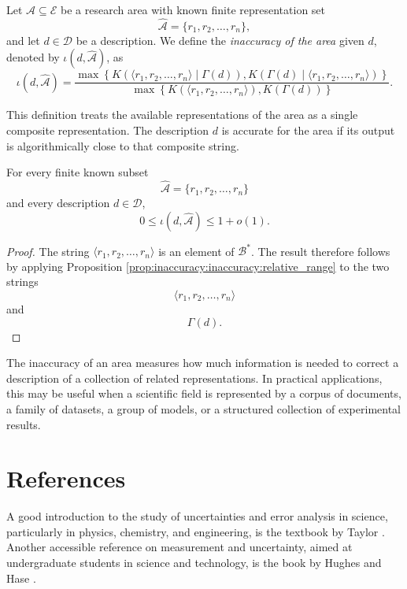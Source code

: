 \begin{definition}
Let \(\mathcal A \subseteq \mathcal E\) be a research area with known finite representation set
\[
\widehat{\mathcal A}
=
\{r_1,r_2,\ldots,r_n\},
\]
and let \(d\in\mathcal D\) be a description. We define the \emph{inaccuracy of the area} given \(d\), denoted by \(\iota(d,\widehat{\mathcal A})\), as
\[
\iota(d,\widehat{\mathcal A})
=
\frac{
\max\left\{
K\left(\langle r_1,r_2,\ldots,r_n\rangle \mid \Gamma(d)\right),
K\left(\Gamma(d)\mid \langle r_1,r_2,\ldots,r_n\rangle\right)
\right\}
}{
\max\left\{
K(\langle r_1,r_2,\ldots,r_n\rangle),
K(\Gamma(d))
\right\}
}.
\]
\end{definition}

This definition treats the available representations of the area as a single composite representation. The description \(d\) is accurate for the area if its output is algorithmically close to that composite string.

\begin{proposition}
\label{prop:inaccuracy:inaccuracy:range}
For every finite known subset
\[
\widehat{\mathcal A}
=
\{r_1,r_2,\ldots,r_n\}
\]
and every description \(d\in\mathcal D\),
\[
0\leq \iota(d,\widehat{\mathcal A})\leq 1+o(1).
\]
\end{proposition}

\begin{proof}
The string \(\langle r_1,r_2,\ldots,r_n\rangle\) is an element of \(\mathcal B^\ast\). The result therefore follows by applying Proposition \ref{prop:inaccuracy:inaccuracy:relative_range} to the two strings
\[
\langle r_1,r_2,\ldots,r_n\rangle
\]
and
\[
\Gamma(d).
\]
\end{proof}

The inaccuracy of an area measures how much information is needed to correct a description of a collection of related representations. In practical applications, this may be useful when a scientific field is represented by a corpus of documents, a family of datasets, a group of models, or a structured collection of experimental results.

%
%

\section*{References}

A good introduction to the study of uncertainties and error analysis in science, particularly in physics, chemistry, and engineering, is the textbook by Taylor \cite{taylor2022introduction}. Another accessible reference on measurement and uncertainty, aimed at undergraduate students in science and technology, is the book by Hughes and Hase \cite{hughes2010measurements}.


